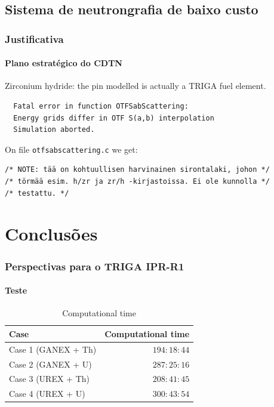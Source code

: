\documentclass[svgnames,smaller,table]{beamer}
\begin{document}
\subsection{Sistema de neutrongrafia de baixo custo}
\begin{frame}[fragile] %
  \frametitle{Justificativa}
  \framesubtitle{Plano estratégico do CDTN}
  \begin{center}
  Zirconium hydride: the pin modelled is actually a TRIGA fuel element.\\
\begin{verbatim}
  Fatal error in function OTFSabScattering:
  Energy grids differ in OTF S(a,b) interpolation
  Simulation aborted.
\end{verbatim}

On file \texttt{otfsabscattering.c} we get:

\begin{verbatim}
/* NOTE: tää on kohtuullisen harvinainen sirontalaki, johon */
/* törmää esim. h/zr ja zr/h -kirjastoissa. Ei ole kunnolla */
/* testattu. */
\end{verbatim}
  
  \end{center}
\end{frame}





\section{Conclusões}
\begin{frame}
  \frametitle{Perspectivas para o TRIGA IPR-R1}
  \framesubtitle{Teste}
  \begin{table}%
    \caption{Computational time}
    \label{time}
    \centering
    \vspace{0.5cm}
    \begin{tabular}{l|r}\hline   
      Case & Computational time\\ \hline
      Case 1 (GANEX + Th) & $194:18:44 $\\ \hline
      Case 2 (GANEX + U) & $287:25:16 $\\ \hline
      Case 3 (UREX + Th) & $208:41:45 $\\ \hline
      Case 4 (UREX + U) & $300:43:54 $\\ \hline
    \end{tabular}
  \end{table}
  
\end{frame}
\end{document}

